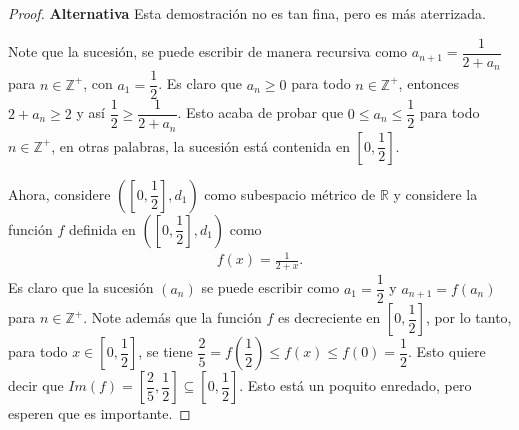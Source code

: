 \begin{itemize}[leftmargin=*]
\begin{enumerate}[a)]
        \begin{proof}
            \textbf{Alternativa} Esta demostración no es tan fina, pero es más aterrizada. 

            Note que la sucesión, se puede escribir de manera recursiva como $a_{n+1}=\dfrac{1}{2+a_{n}}$ para $n \in \mathbb{Z}^+$, con $a_1=\dfrac{1}{2}$. Es claro que $a_n \geq 0$ para todo $n \in \mathbb{Z}^+$, entonces $2+a_n\geq 2$ y así $\dfrac{1}{2}\geq\dfrac{1}{2+a_n}$. Esto acaba de probar que $0\leq a_n \leq \dfrac{1}{2}$ para todo $n \in \mathbb{Z}^+$, en otras palabras, la sucesión está contenida en $\left[0,\dfrac{1}{2}\right]$. 

            Ahora, considere $\left(\left[0,\dfrac{1}{2}\right],d_1\right)$ como subespacio métrico de $\mathbb{R}$ y considere la función $f$ definida en  $\left(\left[0,\dfrac{1}{2}\right],d_1\right)$ como
            \begin{align*}
                f(x)=\frac{1}{2+x}.
            \end{align*}
            Es claro que la sucesión $(a_n)$ se puede escribir como $a_1=\dfrac{1}{2}$ y $a_{n+1}=f(a_n)$ para $n \in \mathbb{Z}^+$. Note además que la función $f$ es decreciente en $\left[0,\dfrac{1}{2}\right]$, por lo tanto, para todo $x \in \left[0,\dfrac{1}{2}\right]$, se tiene $\dfrac{2}{5}=f\left(\dfrac{1}{2}\right)\leq f(x) \leq f(0)=\dfrac{1}{2}$. Esto quiere decir que $Im (f)=\left[\dfrac{2}{5},\dfrac{1}{2}\right] \subseteq \left[0,\dfrac{1}{2}\right]$. Esto está un poquito enredado, pero esperen que es importante. 


\end{proof}
\end{enumerate}
\end{itemize}
